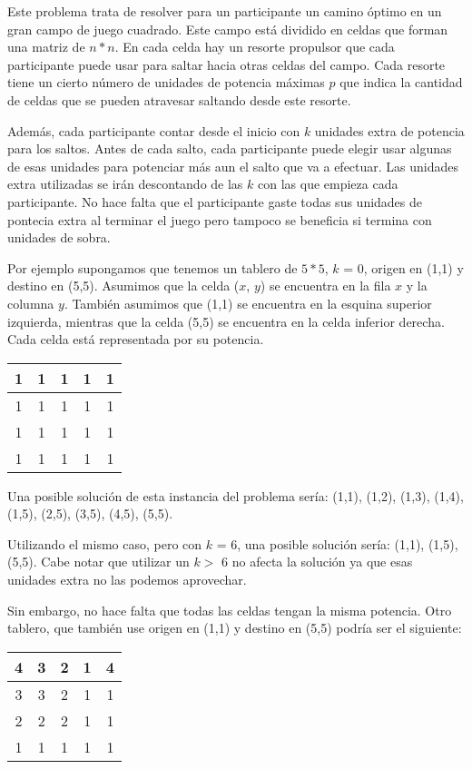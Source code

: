 Este problema trata de resolver para un participante un camino óptimo en un gran campo de juego cuadrado. Este campo está dividido en celdas que forman una matriz de $n * n$. En cada celda hay un resorte propulsor que cada participante puede usar para saltar hacia otras celdas del campo. Cada resorte tiene un cierto número de unidades de potencia máximas $p$ que indica la cantidad de celdas que se pueden atravesar saltando desde este resorte.

Además, cada participante contar desde el inicio con $k$ unidades extra de potencia para los saltos. Antes de cada salto, cada participante puede elegir usar algunas de esas unidades para potenciar más aun el salto que va a efectuar. Las unidades extra utilizadas se irán descontando de las $k$ con las que empieza cada participante. No hace falta que el participante gaste todas sus unidades de pontecia extra al terminar el juego pero tampoco se beneficia si termina con unidades de sobra.

Por ejemplo supongamos que tenemos un tablero de $5*5$, $k$ = 0, origen en (1,1) y destino en (5,5). Asumimos que la celda ($x$, $y$) se encuentra en la fila $x$ y la columna $y$. También asumimos que (1,1) se encuentra en la esquina superior izquierda, mientras que la celda (5,5) se encuentra en la celda inferior derecha. Cada celda está representada por su potencia.
\begin{center}
\begin{tabular}{|c|c|c|c|c|}
\hline
 1 & 1 & 1 & 1 & 1 \\
 \hline
 1 & 1 & 1 & 1 & 1 \\
 \hline
 1 & 1 & 1 & 1 & 1 \\
 \hline
 1 & 1 & 1 & 1 & 1 \\
 \hline
\end{tabular}
\end{center}

Una posible solución de esta instancia del problema sería: (1,1), (1,2), (1,3), (1,4), (1,5), (2,5), (3,5), (4,5), (5,5).

Utilizando el mismo caso, pero con $k$ = 6, una posible solución sería: (1,1), (1,5), (5,5). Cabe notar que utilizar un $k >$ 6 no afecta la solución ya que esas unidades extra no las podemos aprovechar.

Sin embargo, no hace falta que todas las celdas tengan la misma potencia. Otro tablero, que también use origen en (1,1) y destino en (5,5) podría ser el siguiente:
\begin{center}
\begin{tabular}{|c|c|c|c|c|}
\hline
 4 & 3 & 2 & 1 & 4 \\
 \hline
 3 & 3 & 2 & 1 & 1 \\
 \hline
 2 & 2 & 2 & 1 & 1 \\
 \hline
 1 & 1 & 1 & 1 & 1 \\
 \hline
\end{tabular}
\end{center}

